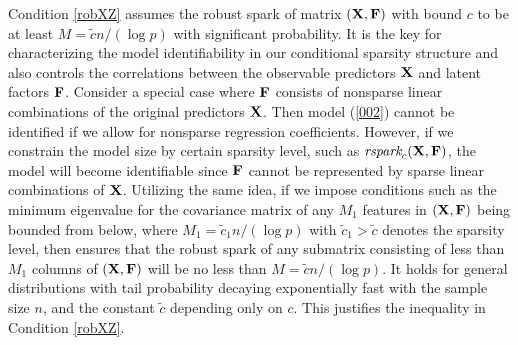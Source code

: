 \documentclass{statsoc}
\newcommand{\bF}{\mbox{\bf F}}
\newcommand{\bX}{\mbox{\bf X}}
\begin{document}
Condition \ref{robXZ} assumes the robust spark of matrix $(\bX, \bF)$ with bound $c$ to be at least $M = \tilde{c} n/(\log p)$ with significant probability. It is the key for characterizing the model identifiability in our conditional sparsity structure and also controls the correlations between the observable predictors $\bX$ and latent factors $\bF$. Consider a special case where $\bF$ consists of nonsparse linear combinations of the original predictors $\bX$. Then model (\ref{002}) cannot be identified if we allow for nonsparse regression coefficients. However, if we constrain the model size by certain sparsity level, such as $\emph{rspark}_c(\bX, \bF)$, the model will become identifiable since $\bF$ cannot be represented by sparse linear combinations of $\bX$. Utilizing the same idea, if we impose conditions such as the minimum eigenvalue for the covariance matrix of any $M_1$ features in $(\bX, \bF)$ being bounded from below, where $M_1 = \tilde{c}_1 n/(\log p)$ with $\tilde{c}_1 > \tilde{c}$ denotes the sparsity level, then \cite[Theorem 2]{Lv2013} ensures that the robust spark of any submatrix consisting of less than $M_1$ columns of $(\bX, \bF)$ will be no less than $M = \tilde{c} n/(\log p)$. It holds for general distributions with tail probability decaying exponentially fast with the sample size $n$, and the constant $\tilde{c}$ depending only on $c$. This justifies the inequality in Condition \ref{robXZ}.


\end{document}
